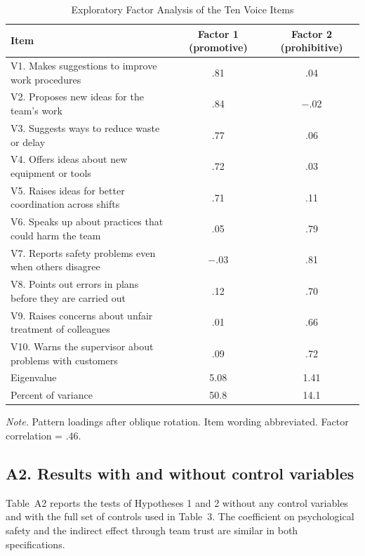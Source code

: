 \documentclass[11pt]{article}
\begin{document}
\begin{table}[ht]
\centering
\begin{threeparttable}
\caption{Exploratory Factor Analysis of the Ten Voice Items}
\footnotesize
\begin{tabular}{lcc}
\toprule
Item & Factor 1 (promotive) & Factor 2 (prohibitive) \\
\midrule
V1. Makes suggestions to improve work procedures & .81 & .04 \\
V2. Proposes new ideas for the team's work & .84 & $-$.02 \\
V3. Suggests ways to reduce waste or delay & .77 & .06 \\
V4. Offers ideas about new equipment or tools & .72 & .03 \\
V5. Raises ideas for better coordination across shifts & .71 & .11 \\
V6. Speaks up about practices that could harm the team & .05 & .79 \\
V7. Reports safety problems even when others disagree & $-$.03 & .81 \\
V8. Points out errors in plans before they are carried out & .12 & .70 \\
V9. Raises concerns about unfair treatment of colleagues & .01 & .66 \\
V10. Warns the supervisor about problems with customers & .09 & .72 \\
\midrule
Eigenvalue & 5.08 & 1.41 \\
Percent of variance & 50.8 & 14.1 \\
\bottomrule
\end{tabular}
\begin{tablenotes}\footnotesize
\item \textit{Note.} Pattern loadings after oblique rotation. Item wording abbreviated. Factor correlation = .46.
\end{tablenotes}
\end{threeparttable}
\end{table}

\subsection*{A2. Results with and without control variables}

Table~A2 reports the tests of Hypotheses 1 and 2 without any control variables and with the full set of controls used in Table~3. The coefficient on psychological safety and the indirect effect through team trust are similar in both specifications.
\end{document}
